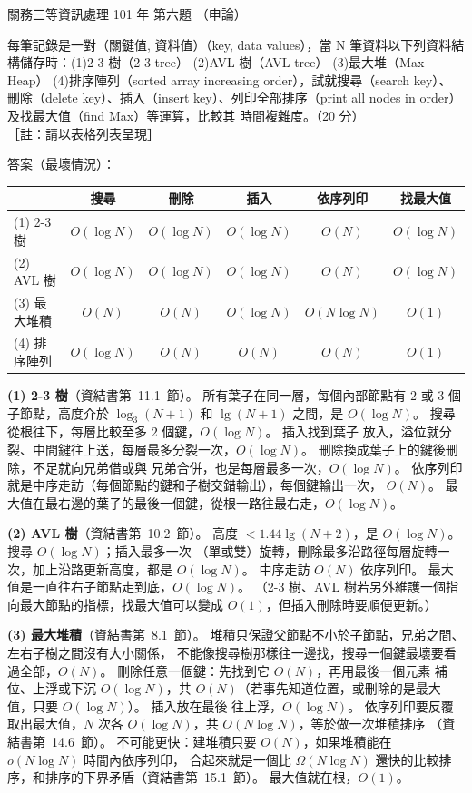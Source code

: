\begin{pastexam}[label={px:gw3-101-ds-06}]{關務三等資訊處理 101 年 第六題}
（申論）

每筆記錄是一對（關鍵值, 資料值）（key, data values），當 N 筆資料以下列資料結構儲存時：(1)2-3 樹（2-3 tree）
(2)AVL 樹（AVL tree） (3)最大堆（Max-Heap） (4)排序陣列（sorted array increasing order），試就搜尋（search key）、
刪除（delete key）、插入（insert key）、列印全部排序（print all nodes in order）及找最大值（find Max）等運算，比較其
時間複雜度。（20 分）\\
［註：請以表格列表呈現］
\end{pastexam}

\begin{pastsoln}
答案（最壞情況）：
\begin{center}
\begin{tabular}{lccccc}
\toprule
 & 搜尋 & 刪除 & 插入 & 依序列印 & 找最大值 \\
\midrule
(1) 2-3 樹 & $O(\log N)$ & $O(\log N)$ & $O(\log N)$ & $O(N)$ & $O(\log N)$ \\
(2) AVL 樹 & $O(\log N)$ & $O(\log N)$ & $O(\log N)$ & $O(N)$ & $O(\log N)$ \\
(3) 最大堆積 & $O(N)$ & $O(N)$ & $O(\log N)$ & $O(N \log N)$ & $O(1)$ \\
(4) 排序陣列 & $O(\log N)$ & $O(N)$ & $O(N)$ & $O(N)$ & $O(1)$ \\
\bottomrule
\end{tabular}
\end{center}

\textbf{(1) 2-3 樹}（資結書第~11.1~節）。 所有葉子在同一層，每個內部節點有 $2$ 或 $3$ 個子節點，高度介於
$\log_3 (N+1)$ 和 $\lg(N+1)$ 之間，是 $O(\log N)$。 搜尋從根往下，每層比較至多 $2$ 個鍵，$O(\log N)$。 插入找到葉子
放入，溢位就分裂、中間鍵往上送，每層最多分裂一次，$O(\log N)$。 刪除換成葉子上的鍵後刪除，不足就向兄弟借或與
兄弟合併，也是每層最多一次，$O(\log N)$。 依序列印就是中序走訪（每個節點的鍵和子樹交錯輸出），每個鍵輸出一次，
$O(N)$。 最大值在最右邊的葉子的最後一個鍵，從根一路往最右走，$O(\log N)$。

\textbf{(2) AVL 樹}（資結書第~10.2~節）。 高度 $< 1.44 \lg(N+2)$，是 $O(\log N)$。 搜尋 $O(\log N)$；插入最多一次
（單或雙）旋轉，刪除最多沿路徑每層旋轉一次，加上沿路更新高度，都是 $O(\log N)$。 中序走訪 $O(N)$ 依序列印。
最大值是一直往右子節點走到底，$O(\log N)$。 （2-3 樹、AVL 樹若另外維護一個指向最大節點的指標，找最大值可以變成
$O(1)$，但插入刪除時要順便更新。）

\textbf{(3) 最大堆積}（資結書第~8.1~節）。 堆積只保證父節點不小於子節點，兄弟之間、左右子樹之間沒有大小關係，
不能像搜尋樹那樣往一邊找，搜尋一個鍵最壞要看過全部，$O(N)$。 刪除任意一個鍵：先找到它 $O(N)$，再用最後一個元素
補位、上浮或下沉 $O(\log N)$，共 $O(N)$（若事先知道位置，或刪除的是最大值，只要 $O(\log N)$）。 插入放在最後
往上浮，$O(\log N)$。 依序列印要反覆取出最大值，$N$ 次各 $O(\log N)$，共 $O(N \log N)$，等於做一次堆積排序
（資結書第~14.6~節）。 不可能更快：建堆積只要 $O(N)$，如果堆積能在 $o(N \log N)$ 時間內依序列印，
合起來就是一個比 $\Omega(N \log N)$ 還快的比較排序，和排序的下界矛盾（資結書第~15.1~節）。
最大值就在根，$O(1)$。


\end{pastsoln}
